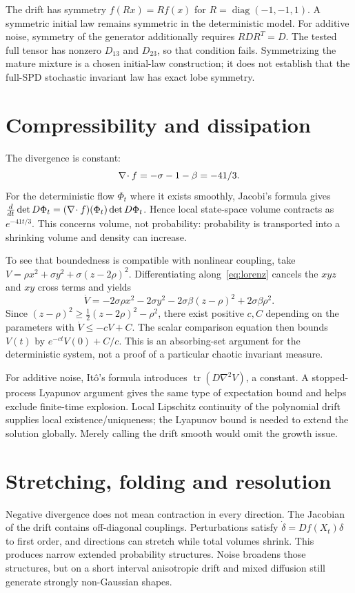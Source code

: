 The drift has symmetry $f(Rx)=Rf(x)$ for $R=\operatorname{diag}(-1,-1,1)$. A symmetric initial law remains symmetric in the deterministic model. For additive noise, symmetry of the generator additionally requires $RDR^T=D$. The tested full tensor has nonzero $D_{13}$ and $D_{23}$, so that condition fails. Symmetrizing the mature mixture is a chosen initial-law construction; it does not establish that the full-SPD stochastic invariant law has exact lobe symmetry.

\section{Compressibility and dissipation}
The divergence is constant:
\begin{equation}\label{eq:divergence}
\nabla\!\cdot f=-\sigma-1-\beta=-41/3.
\end{equation}
For the deterministic flow $\Phi_t$ where it exists smoothly, Jacobi's formula gives
$\frac{d}{dt}\det D\Phi_t=(\nabla\!\cdot f)(\Phi_t)\det D\Phi_t$.
Hence local state-space volume contracts as $e^{-41t/3}$. This concerns volume, not probability: probability is transported into a shrinking volume and density can increase.

To see that boundedness is compatible with nonlinear coupling, take
$V=\rho x^2+\sigma y^2+\sigma(z-2\rho)^2$. Differentiating along~\eqref{eq:lorenz} cancels the $xyz$ and $xy$ cross terms and yields
\begin{equation}\label{eq:lyapunov}
\dot V=-2\sigma\rho x^2-2\sigma y^2-2\sigma\beta(z-\rho)^2+2\sigma\beta\rho^2.
\end{equation}
Since $(z-\rho)^2\ge\frac12(z-2\rho)^2-\rho^2$, there exist positive $c,C$ depending on the parameters with $\dot V\le-cV+C$. The scalar comparison equation then bounds $V(t)$ by $e^{-ct}V(0)+C/c$. This is an absorbing-set argument for the deterministic system, not a proof of a particular chaotic invariant measure.

For additive noise, It\^o's formula introduces $\operatorname{tr}(D\nabla^2V)$, a constant. A stopped-process Lyapunov argument gives the same type of expectation bound and helps exclude finite-time explosion. Local Lipschitz continuity of the polynomial drift supplies local existence/uniqueness; the Lyapunov bound is needed to extend the solution globally. Merely calling the drift smooth would omit the growth issue.

\section{Stretching, folding and resolution}
Negative divergence does not mean contraction in every direction. The Jacobian of the drift contains off-diagonal couplings. Perturbations satisfy $\dot\delta= Df(X_t)\delta$ to first order, and directions can stretch while total volumes shrink. This produces narrow extended probability structures. Noise broadens those structures, but on a short interval anisotropic drift and mixed diffusion still generate strongly non-Gaussian shapes.

